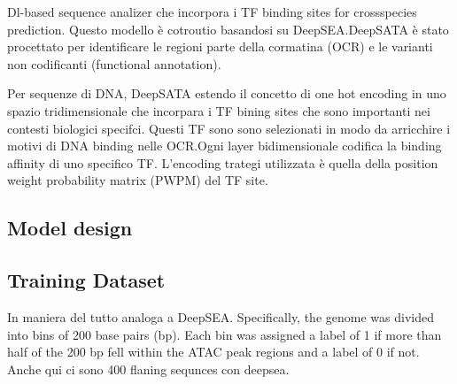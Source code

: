 
Dl-based sequence analizer che incorpora i TF binding sites for crossspecies prediction. Questo modello è cotroutio basandosi su DeepSEA.\@ DeepSATA è stato procettato per identificare le regioni parte della cormatina (OCR) e le varianti non codificanti (functional annotation).

Per sequenze di DNA, DeepSATA estendo il concetto di one hot encoding in uno spazio tridimensionale che incorpara i TF bining sites che sono importanti nei contesti biologici specifci. Questi TF sono sono selezionati in modo da arricchire i motivi di DNA binding nelle OCR.\@ Ogni layer bidimensionale codifica la binding affinity di uno specifico TF. L'encoding trategi utilizzata è quella della position weight probability matrix (PWPM) del TF site.

\subsection*{Model design}


\subsection*{Training Dataset}

In maniera del tutto analoga a DeepSEA. Specifically, the genome was divided into bins of 200 base pairs (bp). Each bin was assigned a label of 1 if more than half of the 200 bp fell within the ATAC peak regions and a label of 0 if not. Anche qui ci sono 400 flaning sequnces con deepsea.
